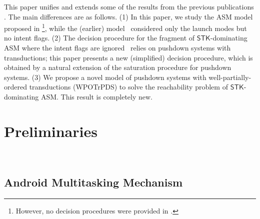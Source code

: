 \documentclass[preprint,12pt]{elsarticle}
\newcommand{\AMASS}{\textsf{ASM}}
\newcommand{\STK}{\mathsf{STK}}
\newcommand{\WOTrPDS}{\textsf{WPOTrPDS}}
\begin{document}
This paper unifies and extends some of the results from the previous publications \cite{CHS+18,HC+19}.  The main differences are %
as follows. (1) In this paper, we study the {\AMASS} model proposed in \cite{HC+19}\footnote{However, no decision procedures were provided in \cite{HC+19}.}, while the (earlier) model~\cite{CHS+18} considered only the launch modes but no intent flags. (2) The decision procedure for the fragment of $\STK$-dominating {\AMASS} where the intent flags are ignored~\cite{CHS+18} relies on pushdown systems with transductions; this paper presents a new (simplified) decision procedure, which is obtained by a natural extension of the saturation procedure for pushdown systems. 
(3) We propose a novel model of pushdown systems with well-partially-ordered transductions (\WOTrPDS) %
to solve the reachability problem of $\STK$-dominating {\AMASS}. This result is completely new.  


%


\section{Preliminaries}~\label{sec:prel}
%

\subsection{Android Multitasking Mechanism} \label{sec:amm}
%
\end{document}
